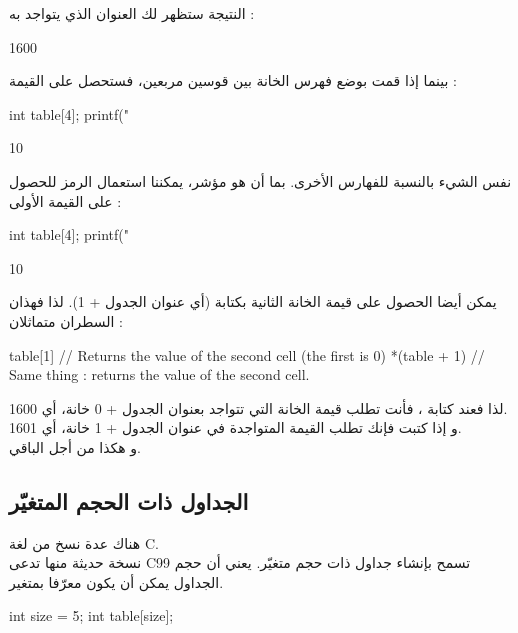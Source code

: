 النتيجة ستظهر لك العنوان الذي يتواجد به
 :

\begin{Console}
1600
\end{Console}

بينما إذا قمت بوضع فهرس الخانة بين قوسين مربعين، فستحصل على القيمة :

\begin{Csource}
int table[4];
printf("%
\end{Csource}

\begin{Console}
10
\end{Console}

نفس الشيء بالنسبة للفهارس الأخرى. بما أن
هو مؤشر، يمكننا استعمال الرمز
\InlineCode{*}
للحصول على القيمة الأولى :

\begin{Csource}
int table[4];
printf("%
\end{Csource}

\begin{Console}
10
\end{Console}

يمكن أيضا الحصول على قيمة الخانة الثانية بكتابة
(أي عنوان الجدول + 1). لذا فهذان السطران متماثلان :

\begin{Csource}
table[1] // Returns the value of the second cell (the first is 0)
*(table + 1) // Same thing : returns the value of the second cell.
\end{Csource}

لذا فعند كتابة
،
فأنت تطلب قيمة الخانة التي تتواجد بعنوان الجدول + 0
خانة، أي 1600.\\
و إذا كتبت
فإنك تطلب القيمة المتواجدة في عنوان الجدول + 1
خانة، أي 1601.\\
و هكذا من أجل الباقي.

\subsection{الجداول ذات الحجم المتغيّر}

هناك عدة نسخ من لغة
\textenglish{C}.\\
نسخة حديثة منها تدعى
\textenglish{C99}
تسمح بإنشاء جداول ذات حجم متغيّر. يعني أن حجم الجداول يمكن أن يكون معرّفا بمتغير.

\begin{Csource}
int size = 5;
int table[size];
\end{Csource}


